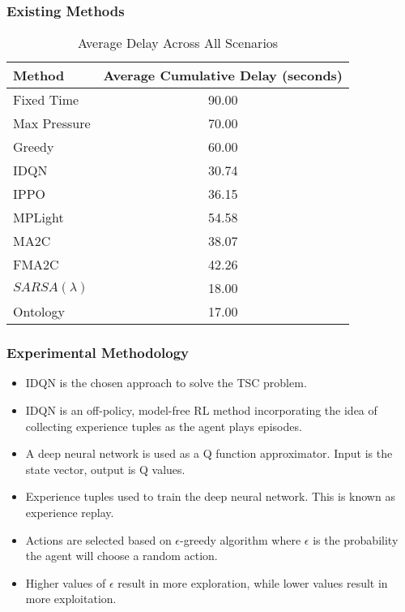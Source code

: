\documentclass[compress,12pt]{beamer}
\begin{document}
\begin{frame}[bg=arguelles.png]
      \frametitle{Existing Methods}

    \begin{table}[H]
    \centering
    \small
    \begin{tabular}{lc}
    \hline
    \textbf{Method} & \textbf{Average Cumulative Delay (seconds)} \\ \hline
    Fixed Time      & 90.00\footnotemark[2]  \\
    Max Pressure    & 70.00\footnotemark[2]  \\
    Greedy          & 60.00\footnotemark[2]  \\
    IDQN            & 30.74                  \\
    IPPO            & 36.15                  \\
    MPLight         & 54.58                  \\
    MA2C            & 38.07\footnotemark[1]                  \\
    FMA2C           & 42.26                  \\
    \(SARSA(\lambda)\)           & 18.00\footnotemark[2]                  \\
    Ontology        & 17.00\footnotemark[2]                  \\ \hline
    \end{tabular}
    \caption{Average Delay Across All Scenarios}
    \label{tab:avg_delay}
    \end{table}
\end{frame}

\begin{frame}[bg=arguelles.png]
      \frametitle{Experimental Methodology}
      \begin{itemize}
      \item IDQN is the chosen approach to solve the TSC problem.
      \item IDQN is an off-policy, model-free RL method incorporating the idea of collecting experience tuples as the agent plays episodes\cite{DBLP:journals/corr/MnihKSGAWR13}.
      \item A deep neural network is used as a Q function approximator. Input is the state vector, output is Q values.
      \item Experience tuples used to train the deep neural network. This is known as experience replay.
      \item Actions are selected based on \(\epsilon\)-greedy algorithm where \(\epsilon\) is the probability the agent will choose a random action\cite{Mnih2015}.
      \item Higher values of \(\epsilon\) result in more exploration, while lower values result in more exploitation.
      \end{itemize}
\end{frame}
\end{document}
